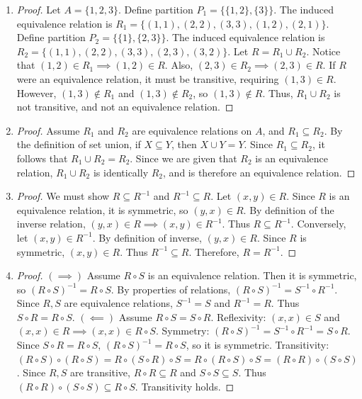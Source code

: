 \documentclass[11pt, a4paper]{article}
\theoremstyle{definition}
\theoremstyle{remark}
\begin{document}
\begin{enumerate}[label=\textbf{\arabic*.}, leftmargin=*]
    \item \begin{proof}
    Let $A = \{1, 2, 3\}$.
    Define partition $P_1 = \{\{1, 2\}, \{3\}\}$. The induced equivalence relation is $R_1 = \{(1,1), (2,2), (3,3), (1,2), (2,1)\}$.
    Define partition $P_2 = \{\{1\}, \{2, 3\}\}$. The induced equivalence relation is $R_2 = \{(1,1), (2,2), (3,3), (2,3), (3,2)\}$.
    Let $R = R_1 \cup R_2$. Notice that $(1, 2) \in R_1 \implies (1, 2) \in R$. Also, $(2, 3) \in R_2 \implies (2, 3) \in R$.
    If $R$ were an equivalence relation, it must be transitive, requiring $(1, 3) \in R$.
    However, $(1, 3) \notin R_1$ and $(1, 3) \notin R_2$, so $(1, 3) \notin R$. Thus, $R_1 \cup R_2$ is not transitive, and not an equivalence relation.
    \end{proof}

    \item \begin{proof}
    Assume $R_1$ and $R_2$ are equivalence relations on $A$, and $R_1 \subseteq R_2$.
    By the definition of set union, if $X \subseteq Y$, then $X \cup Y = Y$.
    Since $R_1 \subseteq R_2$, it follows that $R_1 \cup R_2 = R_2$.
    Since we are given that $R_2$ is an equivalence relation, $R_1 \cup R_2$ is identically $R_2$, and is therefore an equivalence relation.
    \end{proof}

    \item \begin{proof}
    We must show $R \subseteq R^{-1}$ and $R^{-1} \subseteq R$.
    Let $(x, y) \in R$. Since $R$ is an equivalence relation, it is symmetric, so $(y, x) \in R$. By definition of the inverse relation, $(y, x) \in R \implies (x, y) \in R^{-1}$. Thus $R \subseteq R^{-1}$.
    Conversely, let $(x, y) \in R^{-1}$. By definition of inverse, $(y, x) \in R$. Since $R$ is symmetric, $(x, y) \in R$. Thus $R^{-1} \subseteq R$.
    Therefore, $R = R^{-1}$.
    \end{proof}

    \item \begin{proof}
    $(\implies)$ Assume $R \circ S$ is an equivalence relation. Then it is symmetric, so $(R \circ S)^{-1} = R \circ S$. By properties of relations, $(R \circ S)^{-1} = S^{-1} \circ R^{-1}$. Since $R, S$ are equivalence relations, $S^{-1} = S$ and $R^{-1} = R$. Thus $S \circ R = R \circ S$.
    $(\impliedby)$ Assume $R \circ S = S \circ R$. 
    Reflexivity: $(x, x) \in S$ and $(x, x) \in R \implies (x, x) \in R \circ S$.
    Symmetry: $(R \circ S)^{-1} = S^{-1} \circ R^{-1} = S \circ R$. Since $S \circ R = R \circ S$, $(R \circ S)^{-1} = R \circ S$, so it is symmetric.
    Transitivity: $(R \circ S) \circ (R \circ S) = R \circ (S \circ R) \circ S = R \circ (R \circ S) \circ S = (R \circ R) \circ (S \circ S)$. Since $R, S$ are transitive, $R \circ R \subseteq R$ and $S \circ S \subseteq S$. Thus $(R \circ R) \circ (S \circ S) \subseteq R \circ S$. Transitivity holds.
    \end{proof}


\end{enumerate}
\end{document}
